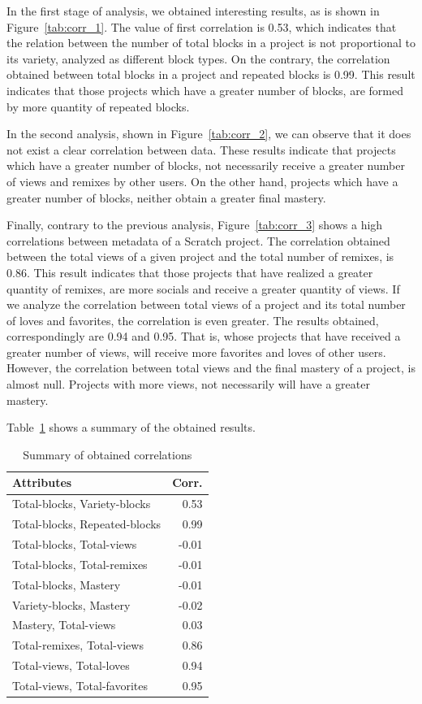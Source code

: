 \documentclass[a4paper,twocolumn,10pt]{article}
\begin{document}
In the first stage of analysis, we obtained interesting results, as is shown in
Figure~\ref{tab:corr_1}. The value of first correlation is 0.53, which indicates that the 
relation between the number of total blocks in a project is not proportional
to its variety, analyzed as different block types. On the contrary, the
correlation obtained between total blocks in a project and repeated blocks is
0.99. This result indicates that those projects which have a greater number of 
blocks, are formed by more quantity of repeated blocks.

In the second analysis, shown in Figure~\ref{tab:corr_2}, we can observe that it does not exist
a clear correlation between data. These results indicate that projects which have
a greater number of blocks, not necessarily receive a greater number of views and
remixes by other users. On the other hand, projects which have a greater number of
blocks, neither obtain a greater final mastery.

Finally, contrary to the previous analysis, Figure~\ref{tab:corr_3} shows a high correlations 
between metadata of a Scratch project. The correlation obtained between the total
views of a given project and the total number of remixes, is 0.86. This result 
indicates that those projects that have realized a greater quantity of remixes,
are more socials and receive a greater quantity of views. If we analyze the 
correlation between total views of a project and its total number of loves and
favorites, the correlation is even greater. The results obtained, correspondingly
are 0.94 and 0.95. That is, whose projects that have received a greater number
of views, will receive more favorites and loves of other users. However, the
correlation between total views and the final mastery of a project, is almost
null. Projects with more views, not necessarily will have a greater mastery.

Table~\ref{tab:values} shows a summary of the obtained results.

\begin{table}
   \begin{tabular}{lr}
    \toprule
    \textbf{Attributes} &\textbf{Corr.} \\
    \midrule
	Total-blocks, Variety-blocks & 0.53\\
        Total-blocks, Repeated-blocks & 0.99\\
        Total-blocks, Total-views & -0.01\\
        Total-blocks, Total-remixes & -0.01\\
        Total-blocks, Mastery & -0.01\\
        Variety-blocks, Mastery & -0.02 \\
        Mastery, Total-views & 0.03\\
        Total-remixes, Total-views & 0.86\\
        Total-views, Total-loves & 0.94\\
        Total-views, Total-favorites & 0.95\\
    \bottomrule
    \end{tabular}
    \caption{Summary of obtained correlations}
    \label{tab:values}
\end{table}
\end{document}
